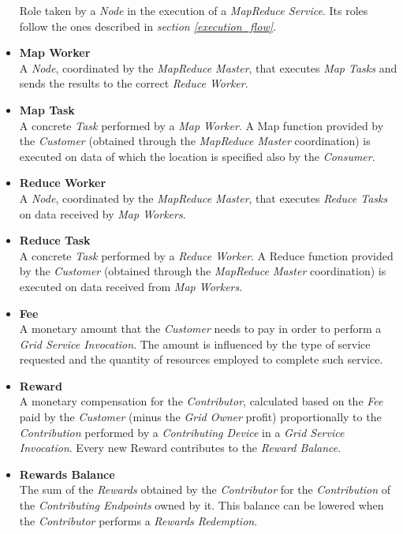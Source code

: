 \begin{itemize}
    Role taken by a \textit{Node} in the execution of a \textit{MapReduce Service}. Its roles follow the ones described in \textit{section \ref{execution_flow}}.
    \item \textbf{Map Worker}\label{map_worker}\\
    A \textit{Node}, coordinated by the \textit{MapReduce Master}, that executes \textit{Map Tasks} and sends the results to the correct \textit{Reduce Worker}.
    \item \textbf{Map Task}\label{map_task}\\
    A concrete \textit{Task} performed by a \textit{Map Worker}. A Map function provided by the \textit{Customer} (obtained through the \textit{MapReduce Master} coordination) is executed on data of which the location is specified also by the \textit{Consumer}.
    \item \textbf{Reduce Worker}\label{reduce_worker}\\
    A \textit{Node}, coordinated by the \textit{MapReduce Master}, that executes \textit{Reduce Tasks} on data received by \textit{Map Workers}.
    \item \textbf{Reduce Task}\label{reduce_task}\\
    A concrete \textit{Task} performed by a \textit{Reduce Worker}. A Reduce function provided by the \textit{Customer} (obtained through the \textit{MapReduce Master} coordination) is executed on data received from \textit{Map Workers}.
    \item \textbf{Fee}\label{fee}\\
    A monetary amount that the \textit{Customer} needs to pay in order to perform a \textit{Grid Service Invocation}. The amount is influenced by the type of service requested and the quantity of resources employed to complete such service.
    \item \textbf{Reward}\label{reward}\\
    A monetary compensation for the \textit{Contributor}, calculated based on the \textit{Fee} paid by the \textit{Customer} (minus the \textit{Grid Owner} profit) proportionally to the \textit{Contribution} performed by a \textit{Contributing Device} in a \textit{Grid Service Invocation}. Every new Reward contributes to the \textit{Reward Balance}.
    \item \textbf{Rewards Balance}\label{rewards_balance}\\
    The sum of the \textit{Rewards} obtained by the \textit{Contributor} for the \textit{Contribution} of the \textit{Contributing Endpoints} owned by it. This balance can be lowered when the \textit{Contributor} performs a \textit{Rewards Redemption}. 

\end{itemize}
